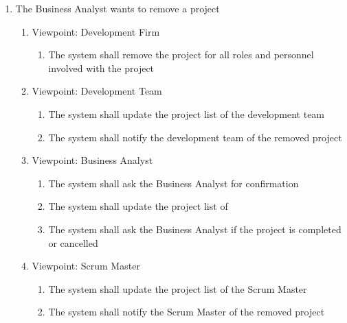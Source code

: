 \documentclass[12pt, titlepage]{article}
\begin{document}
\begin{enumerate}[{BE}1.]
    \item The Business Analyst wants to remove a project
    \begin{enumerate}[{VP}1.] 
        \item Viewpoint: Development Firm
            \begin{enumerate}
                \item The system shall remove the project for all roles and personnel involved with the project
            \end{enumerate}
        \item Viewpoint: Development Team
            \begin{enumerate}
                \item The system shall update the project list of the development team
                \item The system shall notify the development team of the removed project
            \end{enumerate}
        \item Viewpoint: Business Analyst
            \begin{enumerate}
                \item The system shall ask the Business Analyst for confirmation
                \item The system shall update the project list of
                \item The system shall ask the Business Analyst if the project is completed or cancelled
            \end{enumerate}
        \item Viewpoint: Scrum Master
            \begin{enumerate}
                \item The system shall update the project list of the Scrum Master
                \item The system shall notify the Scrum Master of the removed project
            \end{enumerate}
    \end{enumerate}
    

\end{enumerate}
\end{document}
